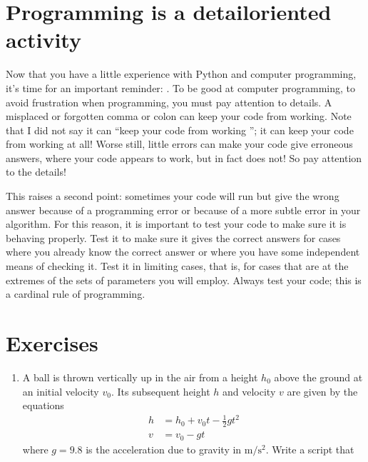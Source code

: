\documentclass[letterpaper,10pt,english]{sphinxmanual}
\begin{document}
\section{Programming is a detail\sphinxhyphen{}oriented activity}
\label{\detokenize{chap2/chap2_basics:programming-is-a-detail-oriented-activity}}
\sphinxAtStartPar
Now that you have a little experience with Python and computer programming, it’s time for an important reminder: .  To be good at computer programming, to avoid frustration when programming, you must pay attention to details.  A misplaced or forgotten comma or colon can keep your code from working.  Note that I did not say it can “keep your code from working ”; it can keep your code from working at all!  Worse still, little errors can make your code give erroneous answers, where your code appears to work, but in fact does not!  So pay attention to the details!

\sphinxAtStartPar
This raises a second point: sometimes your code will run but give the wrong answer because of a programming error or because of a more subtle error in your algorithm.  For this reason, it is important to test your code to make sure it is behaving properly.  Test it to make sure it gives the correct answers for cases where you already know the correct answer or where you have some independent means of checking it.  Test it in limiting cases, that is, for cases that are at the extremes of the sets of parameters you will employ.  Always test your code; this is a cardinal rule of programming.

\newpage


\section{Exercises}
\label{\detokenize{chap2/chap2_basics:exercises}}\begin{enumerate}
%
\item {} 
\sphinxAtStartPar
A ball is thrown vertically up in the air from a height \(h_0\) above the ground at an initial velocity \(v_0\). Its subsequent height \(h\) and velocity \(v\) are given by the equations
\begin{equation*}
\begin{split}h &= h_0 + v_0t - \tfrac{1}{2}gt^2 \\
v &= v_0 - gt\end{split}
\end{equation*}
\sphinxAtStartPar
where \(g = 9.8\) is the acceleration due to gravity in \(\mathrm{m/s^2}\). Write a script that

\end{enumerate}
\end{document}
